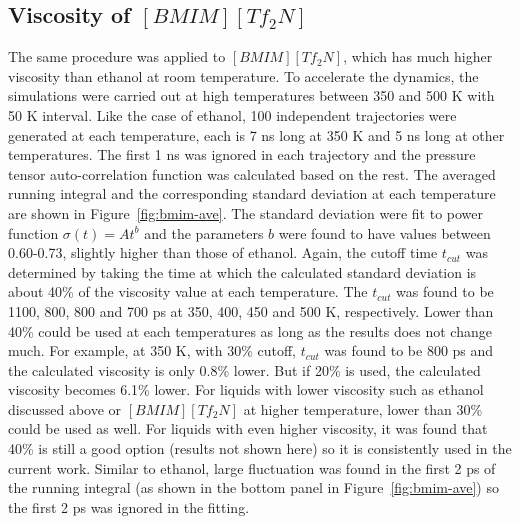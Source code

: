 \documentclass[12pt]{article}
\begin{document}
\subsection{Viscosity of $[BMIM][Tf_2N]$}

The same procedure was applied to $[BMIM][Tf_2N]$,
which has much higher viscosity than ethanol at room temperature.
To accelerate the dynamics, 
the simulations were carried out at high temperatures between 350 and 500 K with 50 K interval.
Like the case of ethanol,
100 independent trajectories were generated at each temperature,
each is 7 ns long at 350 K and 5 ns long at other temperatures.
The first 1 ns was ignored in each trajectory and the pressure tensor auto-correlation function
was calculated based on the rest.
The averaged running integral and the corresponding standard deviation at each temperature
are shown in Figure~\ref{fig:bmim-ave}.
The standard deviation were fit to power function $\sigma(t)=A t^b$
and the parameters $b$ were found to have values between 0.60-0.73,
slightly higher than those of ethanol.
Again, the cutoff time $t_{cut}$ was determined by taking the time at which
the calculated standard deviation is about 40\% of the viscosity value at each temperature.
The $t_{cut}$ was found to be 1100, 800, 800 and 700 ps at 350, 400, 450 and 500 K, respectively.
Lower than 40\% could be used at each temperatures as long as the results does not change much.
For example, at 350 K, 
with 30\% cutoff,  $t_{cut}$ was found to be 800 ps and the calculated viscosity is only 0.8\% lower.
But if 20\% is used, the calculated viscosity becomes 6.1\% lower.
For liquids with lower viscosity such as ethanol discussed above or $[BMIM][Tf_2N]$ at higher temperature,
lower than 30\% could be used as well.
For liquids with even higher viscosity, 
it was found that 40\% is still a good option (results not shown here)
so it is consistently used in the current work.
Similar to ethanol,
large fluctuation was found in the first 2 ps of the running integral (as shown in the bottom panel in Figure~\ref{fig:bmim-ave})
so the first 2 ps was ignored in the fitting.
\end{document}
